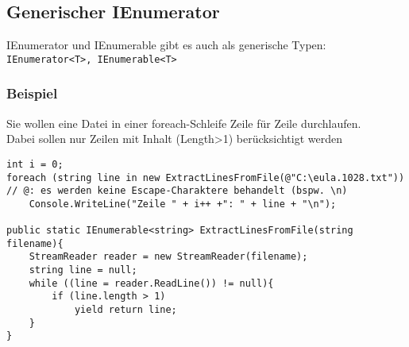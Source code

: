 \subsection{Generischer IEnumerator}
IEnumerator und IEnumerable gibt es auch als generische Typen:\\ \lstinline`IEnumerator<T>, IEnumerable<T>`

\subsubsection*{Beispiel}
Sie wollen eine Datei in einer foreach-Schleife Zeile für Zeile durchlaufen.\\
Dabei sollen nur Zeilen mit Inhalt (Length>1) berücksichtigt werden
\begin{lstlisting}[language={[Sharp]C}]
int i = 0; 
foreach (string line in new ExtractLinesFromFile(@"C:\eula.1028.txt"))	// @: es werden keine Escape-Charaktere behandelt (bspw. \n)
	Console.WriteLine("Zeile " + i++ +": " + line + "\n"); 

public static IEnumerable<string> ExtractLinesFromFile(string filename){
	StreamReader reader = new StreamReader(filename);
	string line = null;	
	while ((line = reader.ReadLine()) != null){
		if (line.length > 1)
			yield return line;
	}
}
\end{lstlisting}
